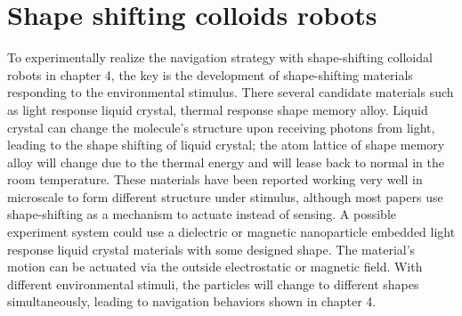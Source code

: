 \section{Shape shifting colloids robots}
To experimentally realize the navigation strategy with shape-shifting colloidal robots in chapter 4, the key is the development of shape-shifting materials responding to the environmental stimulus. There several candidate materials such as  light response liquid crystal\autocite{palagi2016structured}, thermal response shape memory alloy\autocite{busch1991shape}. Liquid crystal can change the molecule's structure upon receiving photons from  light, leading to the shape shifting of liquid crystal; the atom lattice of shape memory alloy will change due to the thermal energy and will lease back to normal in the room temperature. These materials have been reported working very well in microscale to form different structure under stimulus\autocite{breger2015self}, although most papers use shape-shifting as a mechanism to actuate instead of sensing.\autocite{tu2017self,li2018light} A possible experiment system could use a dielectric or magnetic nanoparticle embedded light response liquid crystal materials with some designed shape.   The material's motion can be actuated via the outside electrostatic or magnetic field. With different environmental stimuli, the particles will change to different shapes simultaneously, leading to navigation behaviors shown in chapter 4. 

